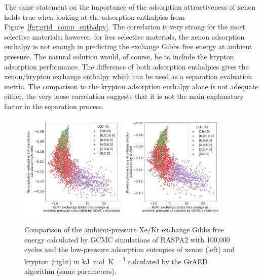 \documentclass[main]{subfiles}
\begin{document}
The same statement on the importance of the adsorption attractiveness of xenon holds true when looking at the adsorption enthalpies from Figure~\ref{fgr:grid_comp_enthalpy}. The correlation is very strong for the most selective materials; however, for less selective materials, the xenon adsorption enthalpy is not enough in predicting the exchange Gibbs free energy at ambient pressure. The natural solution would, of course, be to include the krypton adsorption performance. The difference of both adsorption enthalpies gives the xenon/krypton exchange enthalpy which can be used as a separation evaluation metric. The comparison to the krypton adsorption enthalpy alone is not adequate either, the very loose correlation suggests that it is not the main explanatory factor in the separation process.

\begin{figure}[ht]
  \centering
    \includegraphics[width=0.45\textwidth]{figures/3-fastsim/G_2080_vs_S_Xe_grid_overview.jpg}
    \hfill
    \includegraphics[width=0.45\textwidth]{figures/3-fastsim/G_2080_vs_S_Kr_grid_overview.jpg}
    \caption{Comparison of the ambient-pressure Xe/Kr exchange Gibbs free energy calculated by GCMC simulations of RASPA2 with 100,000 cycles and the low-pressure adsorption entropies of xenon (left) and krypton (right) in \si{\kilo\joule\per\mole\per\kelvin} calculated by the GrAED algorithm (same parameters).}\label{fgr:grid_comp_entropy}
\end{figure}
\end{document}
